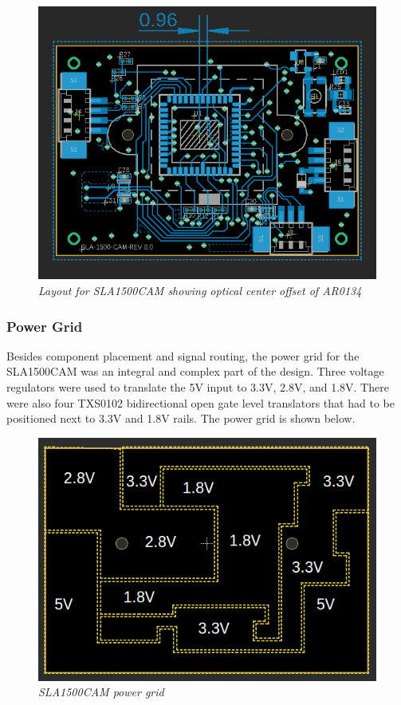 \documentclass[11pt]{article}
\begin{document}
    \begin{figure}[H]
	\centering	
	\includegraphics[width=5.5 in]{opcenter2}
	\caption{\textit{Layout for SLA1500CAM showing optical center offset of AR0134}}	
	\end{figure}

\newpage

\subsubsection{Power Grid}

Besides component placement and signal routing, the power grid for the SLA1500CAM was an integral and complex part of the design. Three voltage regulators were used to translate the 5V input to 3.3V, 2.8V, and 1.8V. There were also four TXS0102 bidirectional open gate level translators that had to be positioned next to 3.3V and 1.8V rails. The power grid is shown below.

    \begin{figure}[H]
	\centering	
	\includegraphics[width=5.5 in]{power1}
	\caption{\textit{SLA1500CAM power grid}}	
	\end{figure}
\end{document}
